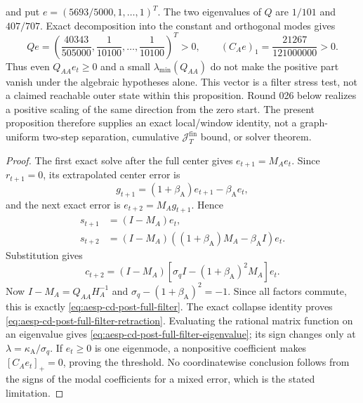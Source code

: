 \begin{proposition}
and put
$e=(5693/5000,1,\ldots,1)^T$.  The two eigenvalues of $Q$ are
$1/101$ and $407/707$.  Exact decomposition into the constant and
orthogonal modes gives
\begin{equation}
 Qe=\left(\frac{40343}{505000},
          \frac1{10100},\ldots,\frac1{10100}\right)^T>0,
 \qquad
 (C_Ae)_1=\frac{21267}{121000000}>0.
 \label{eq:aesp-cd-post-full-k8-mixing}
\end{equation}
Thus even $Q_{AA}e_t\geq0$ and a small
$\lambda_{\min}(Q_{AA})$ do not make the positive part vanish under the
algebraic hypotheses alone.  This vector is a filter stress test, not a
claimed reachable outer state within this proposition.  Round 026 below
realizes a positive scaling of the same direction from the zero start.  The
present proposition therefore supplies an exact
local/window identity, not a graph-uniform two-step separation, cumulative
$\mathcal J_T^{\mathrm{fin}}$ bound, or solver theorem.
\end{proposition}

\begin{proof}
The first exact solve after the full center gives
$e_{t+1}=M_Ae_t$.  Since $r_{t+1}=0$, its extrapolated center error is
\begin{equation*}
 g_{t+1}=(1+\beta_{\mathrm A})e_{t+1}
             -\beta_{\mathrm A}e_t,
\end{equation*}
and the next exact error is $e_{t+2}=M_Ag_{t+1}$.  Hence
\begin{align*}
 s_{t+1}&=(I-M_A)e_t,\\
 s_{t+2}&=(I-M_A)
       ((1+\beta_{\mathrm A})M_A-\beta_{\mathrm A}I)e_t.
\end{align*}
Substitution gives
\begin{equation*}
 c_{t+2}
 =(I-M_A)
 \left[\sigma_qI-(1+\beta_{\mathrm A})^2M_A\right]e_t.
\end{equation*}
Now $I-M_A=Q_{AA}H_A^{-1}$ and
$\sigma_q-(1+\beta_{\mathrm A})^2=-1$.  Since all factors commute, this is
exactly \cref{eq:aesp-cd-post-full-filter}.  The exact collapse identity
proves \cref{eq:aesp-cd-post-full-filter-retraction}.  Evaluating the
rational matrix function on an eigenvalue gives
\cref{eq:aesp-cd-post-full-filter-eigenvalue}; its sign changes only at
$\lambda=\kappa_{\mathrm A}/\sigma_q$.  If $e_t\geq0$ is one eigenmode, a
nonpositive coefficient makes $[C_Ae_t]_+=0$, proving the threshold.  No
coordinatewise conclusion follows from the signs of the modal coefficients
for a mixed error, which is the stated limitation.
\end{proof}

